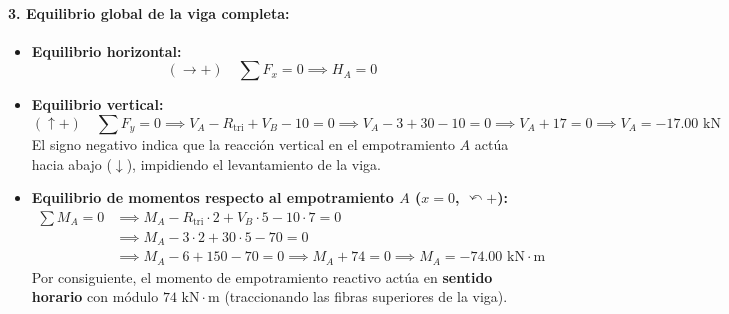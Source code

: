 \paragraph{3. Equilibrio global de la viga completa:}
\begin{itemize}
    \item \textbf{Equilibrio horizontal:}
    \begin{equation}
        (\rightarrow +) \quad \sum F_x = 0 \implies \boxed{H_A = 0}
    \end{equation}
    \item \textbf{Equilibrio vertical:}
    \begin{equation}
        (\uparrow +) \quad \sum F_y = 0 \implies V_A - R_{\text{tri}} + V_B - 10 = 0 \implies V_A - 3 + 30 - 10 = 0 \implies V_A + 17 = 0 \implies \boxed{V_A = -17.00\text{ kN}}
    \end{equation}
    El signo negativo indica que la reacción vertical en el empotramiento $A$ actúa hacia abajo ($\downarrow$), impidiendo el levantamiento de la viga.
    \item \textbf{Equilibrio de momentos respecto al empotramiento $A$ ($x = 0$, $\curvearrowleft +$):}
    \begin{align}
        \sum M_A = 0 &\implies M_A - R_{\text{tri}} \cdot 2 + V_B \cdot 5 - 10 \cdot 7 = 0 \nonumber \\
        &\implies M_A - 3 \cdot 2 + 30 \cdot 5 - 70 = 0 \nonumber \\
        &\implies M_A - 6 + 150 - 70 = 0 \implies M_A + 74 = 0 \implies \boxed{M_A = -74.00\text{ kN}\cdot\text{m}}
    \end{align}
    Por consiguiente, el momento de empotramiento reactivo actúa en \textbf{sentido horario} con módulo $74\text{ kN}\cdot\text{m}$ (traccionando las fibras superiores de la viga).
\end{itemize}

